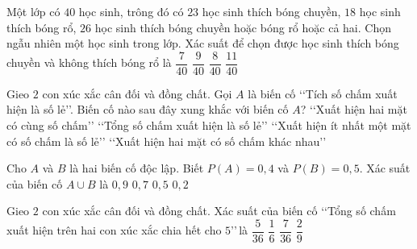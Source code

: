 \begin{ex}%
	Một lớp có $40$ học sinh, trông đó có $23$ học sinh thích bóng chuyền, $18$ học sinh thích bóng rổ, $26$ học sinh thích bóng chuyền hoặc bóng rổ hoặc cả hai. Chọn ngẫu nhiên một học sinh trong lớp. Xác suất để chọn được học sinh thích bóng chuyền và không thích bóng rổ là 
	\choice
	{$\dfrac{7}{40}$} 
	{$\dfrac{9}{40}$} 
	{\True$\dfrac{8}{40}$} 
	{$\dfrac{11}{40}$}
\end{ex}
\begin{ex}%
	Gieo $2$ con xúc xắc cân đối và đồng chất. Gọi $A$ là biến cố \lq\lq  Tích số chấm xuất hiện là số lẻ\rq\rq. Biến cố nào sau đây xung khắc với biến cố $A$?
	\choice
	{\lq\lq  Xuất hiện hai mặt có cùng số chấm\rq\rq}
	{\True \lq\lq  Tổng số chấm xuất hiện là số lẻ\rq\rq}
	{\lq\lq  Xuất hiện ít nhất một mặt có số chấm là số lẻ\rq\rq}
	{\lq\lq  Xuất hiện hai mặt có số chấm khác nhau\rq\rq}
\end{ex}
\begin{ex}%
	Cho $A$ và $B$ là hai biến cố độc lập. Biết $P(A)=0{,}4$ và $P(B)=0{,}5$. Xác suất của biến cố $A \cup B$ là
	\choice
	{$0{,}9$ }
	{\True $0{,}7$} 
	{$0{,}5$} 
	{$0{,}2$}
\end{ex}
\begin{ex}%
	Gieo $2$ con xúc xắc cân đối và đồng chất. Xác suất của biến cố \lq\lq  Tổng số chấm xuất hiện trên hai con xúc xắc chia hết cho $5$\rq\rq$\,$là
	\choice
	{$\dfrac{5}{36}$}
	{$\dfrac{1}{6}$}
	{\True $\dfrac{7}{36}$}
	{$\dfrac{2}{9}$}
\end{ex}
